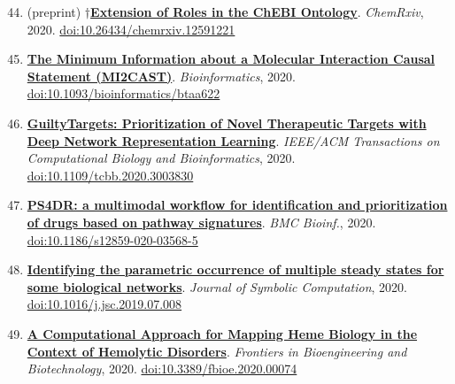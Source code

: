 \documentclass[10pt,a4paper,sans]{moderncv} %
\newcommand{\wikidata}[2]{\href{https://bioregistry.io/wikidata:#1?provider=scholia}{{#2}}}
\begin{document}
    \begin{enumerate}
    \setcounter{enumi}{43}
    \itemsep0.5em
        \item
        (preprint) $\dagger$\wikidata{Q96909013}{\textbf{Extension of Roles in the ChEBI Ontology}}.
    \textit{ChemRxiv}, 2020.  {\scriptsize \href{https://bioregistry.io/doi:10.26434/CHEMRXIV.12591221}{doi:10.26434/chemrxiv.12591221}}
        \item
        \wikidata{Q97063807}{\textbf{The Minimum Information about a Molecular Interaction Causal Statement (MI2CAST)}}.
    \textit{Bioinformatics}, 2020.  {\scriptsize \href{https://bioregistry.io/doi:10.1093/BIOINFORMATICS/BTAA622}{doi:10.1093/bioinformatics/btaa622}}
        \item
        \wikidata{Q98200725}{\textbf{GuiltyTargets: Prioritization of Novel Therapeutic Targets with Deep Network Representation Learning}}.
    \textit{IEEE/ACM Transactions on Computational Biology and Bioinformatics}, 2020.  {\scriptsize \href{https://bioregistry.io/doi:10.1109/TCBB.2020.3003830}{doi:10.1109/tcbb.2020.3003830}}
        \item
        \wikidata{Q96169295}{\textbf{PS4DR: a multimodal workflow for identification and prioritization of drugs based on pathway signatures}}.
    \textit{BMC Bioinf.}, 2020.  {\scriptsize \href{https://bioregistry.io/doi:10.1186/S12859-020-03568-5}{doi:10.1186/s12859-020-03568-5}}
        \item
        \wikidata{Q118952373}{\textbf{Identifying the parametric occurrence of multiple steady states for some biological networks}}.
    \textit{Journal of Symbolic Computation}, 2020.  {\scriptsize \href{https://bioregistry.io/doi:10.1016/J.JSC.2019.07.008}{doi:10.1016/j.jsc.2019.07.008}}
        \item
        \wikidata{Q90643177}{\textbf{A Computational Approach for Mapping Heme Biology in the Context of Hemolytic Disorders}}.
    \textit{Frontiers in Bioengineering and Biotechnology}, 2020.  {\scriptsize \href{https://bioregistry.io/doi:10.3389/FBIOE.2020.00074}{doi:10.3389/fbioe.2020.00074}}
    \end{enumerate}
\end{document}
